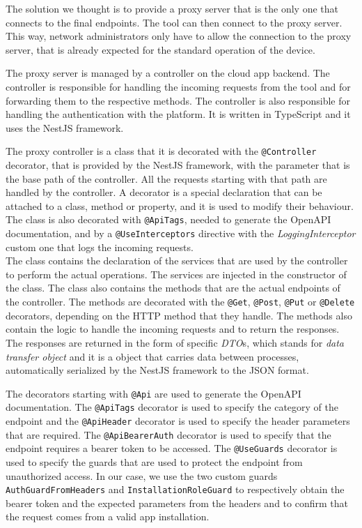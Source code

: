 The solution we thought is to provide a proxy server that is the only one that connects to the final endpoints. The tool can then connect to the proxy server. This way, network administrators only have to allow the connection to the proxy server, that is already expected for the standard operation of the device.

The proxy server is managed by a controller on the cloud app backend. The controller is responsible for handling the incoming requests from the tool and for forwarding them to the respective methods. The controller is also responsible for handling the authentication with the platform. It is written in TypeScript and it uses the NestJS framework.

The proxy controller is a class that it is decorated with the \texttt{@Controller} decorator, that is provided by the NestJS framework, with the parameter that is the base path of the controller. All the requests starting with that path are handled by the controller. A decorator is a special declaration that can be attached to a class, method or property, and it is used to modify their behaviour. The class is also decorated with \texttt{@ApiTags}, needed to generate the OpenAPI documentation, and by a \texttt{@UseInterceptors} directive with the \textit{LoggingInterceptor} custom one that logs the incoming requests. \\
The class contains the declaration of the services that are used by the controller to perform the actual operations. The services are injected in the constructor of the class. The class also contains the methods that are the actual endpoints of the controller. The methods are decorated with the \texttt{@Get}, \texttt{@Post}, \texttt{@Put} or \texttt{@Delete} decorators, depending on the HTTP method that they handle. The methods also contain the logic to handle the incoming requests and to return the responses. The responses are returned in the form of specific \textit{DTO}s, which stands for \textit{data transfer object} and it is a object that carries data between processes, automatically serialized by the NestJS framework to the JSON format.

The decorators starting with \texttt{@Api} are used to generate the OpenAPI documentation. The \texttt{@ApiTags} decorator is used to specify the category of the endpoint and the \texttt{@ApiHeader} decorator is used to specify the header parameters that are required. The \texttt{@ApiBearerAuth} decorator is used to specify that the endpoint requires a bearer token to be accessed. The \texttt{@UseGuards} decorator is used to specify the guards that are used to protect the endpoint from unauthorized access. In our case, we use the two custom guards \texttt{AuthGuardFromHeaders} and \texttt{InstallationRoleGuard} to respectively obtain the bearer token and the expected parameters from the headers and to confirm that the request comes from a valid app installation.


